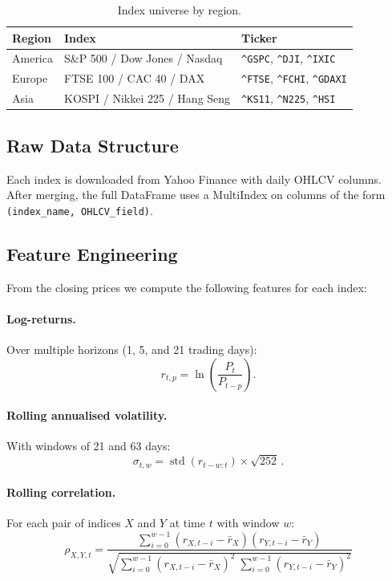 \documentclass[11pt, a4paper]{article}
\begin{document}
\begin{table}[H]
\centering
\caption{Index universe by region.}
\label{tab:index_universe}
\small
\renewcommand{\arraystretch}{1.1}
\begin{tabular}{l l l}
\toprule
\textbf{Region} & \textbf{Index} & \textbf{Ticker} \\
\midrule
America & S\&P 500 / Dow Jones / Nasdaq & \texttt{\^{}GSPC}, \texttt{\^{}DJI}, \texttt{\^{}IXIC} \\
Europe  & FTSE 100 / CAC 40 / DAX       & \texttt{\^{}FTSE}, \texttt{\^{}FCHI}, \texttt{\^{}GDAXI} \\
Asia    & KOSPI / Nikkei 225 / Hang Seng & \texttt{\^{}KS11}, \texttt{\^{}N225}, \texttt{\^{}HSI} \\
\bottomrule
\end{tabular}
\end{table}

\subsection{Raw Data Structure}
Each index is downloaded from Yahoo Finance with daily OHLCV columns.
After merging, the full DataFrame uses a MultiIndex on columns of the form
\texttt{(index\_name, OHLCV\_field)}.

\subsection{Feature Engineering}
From the closing prices we compute the following features for each index:

\paragraph{Log-returns.}
Over multiple horizons (1, 5, and 21 trading days):
\begin{equation}
\label{eq:log_return}
r_{t,p} = \ln\!\left(\frac{P_{t}}{P_{t-p}}\right).
\end{equation}

\paragraph{Rolling annualised volatility.}
With windows of 21 and 63 days:
\begin{equation}
\label{eq:vol}
\sigma_{t,w} = \operatorname{std}\!\left(r_{t-w:t}\right) \times \sqrt{252}\,.
\end{equation}

\paragraph{Rolling correlation.}
For each pair of indices $X$ and $Y$ at time $t$ with window $w$:
\begin{equation}
\label{eq:rolling_corr}
    \rho_{X,Y,t} = \frac{\sum_{i=0}^{w-1} (r_{X,t-i} - \bar{r}_X)(r_{Y,t-i} - \bar{r}_Y)}{\sqrt{\sum_{i=0}^{w-1} (r_{X,t-i} - \bar{r}_X)^2 \;\sum_{i=0}^{w-1} (r_{Y,t-i} - \bar{r}_Y)^2}}
\end{equation}
\end{document}
